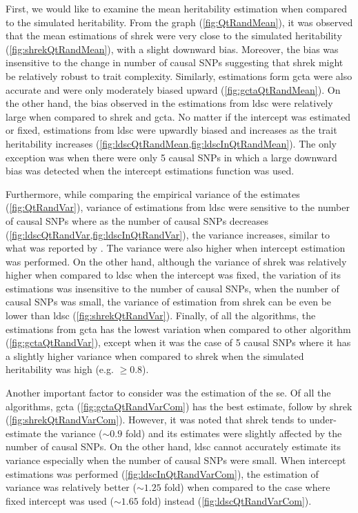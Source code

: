 		First, we would like to examine the mean heritability estimation when compared to the simulated heritability.
		From the graph (\cref{fig:QtRandMean}), it was observed that the mean estimations of \gls{shrek} were very close to the simulated heritability (\cref{fig:shrekQtRandMean}), with a slight downward bias. 
		Moreover, the bias was insensitive to the change in number of causal \glspl{SNP} suggesting that \gls{shrek} might be relatively robust to trait complexity.
		Similarly, estimations form \gls{gcta} were also accurate and were only moderately biased upward (\cref{fig:gctaQtRandMean}). 
		On the other hand, the bias observed in the estimations from \gls{ldsc} were relatively large when compared to \gls{shrek} and \gls{gcta}.
		No matter if the intercept was estimated or fixed, estimations from \gls{ldsc} were upwardly biased and increases as the trait heritability increases (\cref{fig:ldscQtRandMean,fig:ldscInQtRandMean}).
		The only exception was when there were only 5 causal \glspl{SNP} in which a large downward bias was detected when the intercept estimations function was used. 
		
		Furthermore, while comparing the empirical variance of the estimates (\cref{fig:QtRandVar}), variance of estimations from \gls{ldsc} were sensitive to the number of causal \glspl{SNP} where as the number of causal \glspl{SNP} decreases (\cref{fig:ldscQtRandVar,fig:ldscInQtRandVar}), the variance increases, similar to what was reported by \citet{Bulik-Sullivan2015}.
		The variance were also higher when intercept estimation was performed. 
		On the other hand, although the variance of \gls{shrek} was relatively higher when compared to \gls{ldsc} when the intercept was fixed, the variation of its estimations was insensitive to the number of causal \glspl{SNP}, when the number of causal \glspl{SNP} was small, the variance of estimation from \gls{shrek} can be even be lower than \gls{ldsc} (\cref{fig:shrekQtRandVar}).
		Finally, of all the algorithms, the estimations from \gls{gcta} has the lowest variation when compared to other algorithm (\cref{fig:gctaQtRandVar}), except when it was the case of 5 causal \glspl{SNP} where it has a slightly higher variance when compared to \gls{shrek} when the simulated heritability was high (e.g. $\ge 0.8$).
		
		Another important factor to consider was the estimation of the \gls{se}. 
		Of all the algorithms, \gls{gcta} (\cref{fig:gctaQtRandVarCom}) has the best estimate, follow by \gls{shrek} (\cref{fig:shrekQtRandVarCom}).
		However, it was noted that \gls{shrek} tends to under-estimate the variance ($\sim0.9$ fold) and its estimates were slightly affected by the number of causal \glspl{SNP}.
		On the other hand, \gls{ldsc} cannot accurately estimate its variance especially when the number of causal \glspl{SNP} were small. 
		When intercept estimations was performed (\cref{fig:ldscInQtRandVarCom}), the estimation of variance was relatively better ($\sim1.25$ fold) when compared to the case where fixed intercept was used ($\sim1.65$ fold) instead (\cref{fig:ldscQtRandVarCom}). 
		
